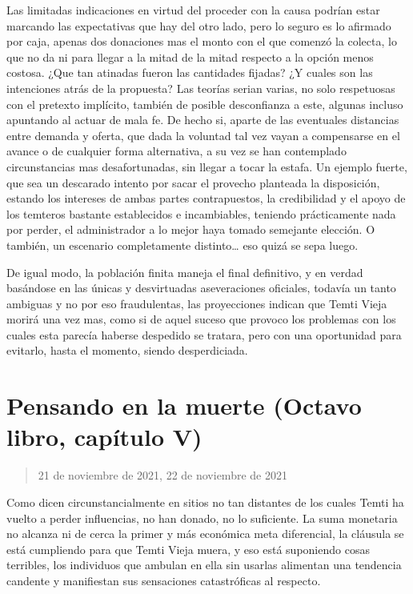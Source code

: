 \documentclass[
]{book}
\begin{document}
Las limitadas indicaciones en virtud del proceder con la causa podrían estar marcando las expectativas que hay del otro lado, pero lo seguro es lo afirmado por caja, apenas dos donaciones mas el monto con el que comenzó la colecta, lo que no da ni para llegar a la mitad de la mitad respecto a la opción menos costosa. ¿Que tan atinadas fueron las cantidades fijadas? ¿Y cuales son las intenciones atrás de la propuesta? Las teorías serian varias, no solo respetuosas con el pretexto implícito, también de posible desconfianza a este, algunas incluso apuntando al actuar de mala fe. De hecho si, aparte de las eventuales distancias entre demanda y oferta, que dada la voluntad tal vez vayan a compensarse en el avance o de cualquier forma alternativa, a su vez se han contemplado circunstancias mas desafortunadas, sin llegar a tocar la estafa. Un ejemplo fuerte, que sea un descarado intento por sacar el provecho planteada la disposición, estando los intereses de ambas partes contrapuestos, la credibilidad y el apoyo de los temteros bastante establecidos e incambiables, teniendo prácticamente nada por perder, el administrador a lo mejor haya tomado semejante elección. O también, un escenario completamente distinto\ldots{} eso quizá se sepa luego.

De igual modo, la población finita maneja el final definitivo, y en verdad basándose en las únicas y desvirtuadas aseveraciones oficiales, todavía un tanto ambiguas y no por eso fraudulentas, las proyecciones indican que Temti Vieja morirá una vez mas, como si de aquel suceso que provoco los problemas con los cuales esta parecía haberse despedido se tratara, pero con una oportunidad para evitarlo, hasta el momento, siendo desperdiciada.

\hypertarget{pensando-en-la-muerte-octavo-libro-capuxedtulo-v}{%
\section{Pensando en la muerte (Octavo libro, capítulo V)}\label{pensando-en-la-muerte-octavo-libro-capuxedtulo-v}}

\begin{quote}
21 de noviembre de 2021, 22 de noviembre de 2021
\end{quote}

Como dicen circunstancialmente en sitios no tan distantes de los cuales Temti ha vuelto a perder influencias, no han donado, no lo suficiente. La suma monetaria no alcanza ni de cerca la primer y más económica meta diferencial, la cláusula se está cumpliendo para que Temti Vieja muera, y eso está suponiendo cosas terribles, los individuos que ambulan en ella sin usarlas alimentan una tendencia candente y manifiestan sus sensaciones catastróficas al respecto.
\end{document}
